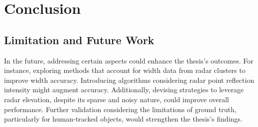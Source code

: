 
\chapter{Conclusion}\label{chap:conclusion}


\section{Limitation and Future Work}
In the future, addressing certain aspects could enhance the thesis's outcomes. 
For instance, exploring methods that account for width data from radar clusters to improve width accuracy. 
Introducing algorithms considering radar point reflection intensity might augment accuracy. 
Additionally, devising strategies to leverage radar elevation, 
despite its sparse and noisy nature, could improve overall performance. 
Further validation considering the limitations of ground truth, 
particularly for human-tracked objects, would strengthen the thesis's findings.

